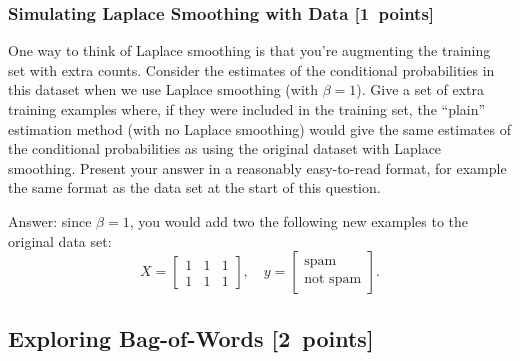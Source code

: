 \documentclass{article}
\newcommand{\blu}[1]{{\textcolor{blu}{#1}}}
\newcommand{\gre}[1]{\textcolor{gre}{#1}}
\newcommand\ans[1]{\par\gre{Answer: #1}}
\let\ask\blu
\newcommand\pts[1]{\textcolor{pointscolour}{[#1~points]}}
\begin{document}
    \subsubsection{Simulating Laplace Smoothing with Data \pts{1}}
    \label{laplace.conceptual}

    One way to think of Laplace smoothing is that you're augmenting the training set with extra counts. Consider the estimates of the conditional probabilities in this dataset when we use Laplace smoothing (with $\beta = 1$).
    \ask{Give a set of extra training examples where, if they were included in the training set, the ``plain'' estimation method (with no Laplace smoothing) would give the same estimates of the conditional probabilities as using the original dataset with Laplace smoothing.}
    Present your answer in a reasonably easy-to-read format, for example the same format as the data set at the start of this question.
    \ans{since $\beta = 1$, you would add two the following new examples to the original data set: }
    \[
    X = \begin{bmatrix}
        1 & 1 & 1\\
        1 & 1 & 1
    \end{bmatrix},
    \quad y = \begin{bmatrix}
        \text{spam}\\
        \text{not spam}
    \end{bmatrix}.
    \]

    \clearpage
    \subsection{Exploring Bag-of-Words \pts{2}}
\end{document}
